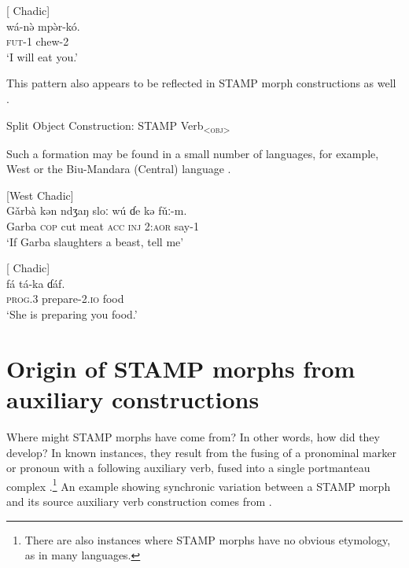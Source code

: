 \documentclass[output=paper]{langsci/langscibook}
\begin{document}
\ea\label{ex:anderson:29}
 \citep[263]{Frajzyngier2008}        [ Chadic]\\
\gll wá-n\`{ə}    mp\`{ə}r-kó.\\
\textsc{fut}-1    chew-2\\
\glt `I will eat you.'
\z

This pattern also appears to be reflected in STAMP morph constructions as well . 

\ea\label{ex:anderson:30}
Split Object Construction:   STAMP  Verb\textsc{\textsubscript{<obj>}}
\z

Such a formation may be found in a small number of  languages, for example, West    or the Biu-Mandara (Central)  language  . 

\ea\label{ex:anderson:31}
 \citep[153]{Caron2008}          [West Chadic]\\
\gll Gǎrbà   kən  ndʒaŋ  sloː  wú  ɗe  kə   fǔː-m. \\
Garba  \textsc{cop}  cut  meat  \textsc{acc}  \textsc{inj}  \textsc{2:aor}  say-1  \\
\glt `If Garba slaughters a beast, tell me'
\z

\ea\label{ex:anderson:32}
 \citep[4]{Pohlig1992}          [ Chadic]\\
\gll fá    tá-ka    ɗáf.      \\
\textsc{prog.3}  prepare-2\textsc{.io}  food    \\
\glt `She is preparing you food.'
\z

\section{Origin of STAMP morphs from auxiliary constructions}\label{sec:Anderson:5}

Where might STAMP morphs have come from? In other words, how did they develop? In known instances, they result from the fusing of a pronominal marker or pronoun with a following auxiliary verb, fused into a single portmanteau complex \citep{Anderson2006, Anderson2011}.\footnote{There are also instances where STAMP morphs have no obvious etymology, as in many  languages.} An example showing synchronic variation between a STAMP morph and its source auxiliary verb construction comes from  .
\end{document}
